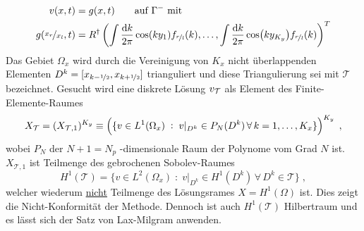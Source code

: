 \begin{equation}
  \begin{aligned}
    v(x,t) &= g(x,t) \qquad \text{auf }{\Gamma^-} \text{ mit} \\
    g(\nicefrac{x_r}{x_l},t) &= R^{\dagger} \left(\int \frac{\mathop{}\!\mathrm{d} k}{2\pi} \cos(ky_1)     f_{\nicefrac{r}{l}} (k), \dots,
                                            \int \frac{\mathop{}\!\mathrm{d} k}{2\pi} \cos(ky_{K_y}) f_{\nicefrac{r}{l}} (k)\right)^T
  \end{aligned}
\end{equation}
Das Gebiet $\Omega_x$ wird durch die Vereinigung von $K_x$ nicht überlappenden Elementen ${D^k = [x_{k-\nicefrac{1}{2}} , x_{k+\nicefrac{1}{2}}]}$ trianguliert und diese Triangulierung sei mit $\mathcal{T}$ bezeichnet. Gesucht wird eine diskrete Lösung $v_{\mathcal{T}}$ als Element des Finite-Elemente-Raumes
\begin{equation}
  X_{\mathcal{T}} = (X_{\mathcal{T},1})^{K_y} \equiv \left( \{ v \in L^1(\Omega_x) \; : \; v\rvert_{D^k} \in P_N(D^k) \, \forall \, k=1,\dots,K_x \} \right)^{K_y} \; ,
  \label{eq:FES}
\end{equation}
wobei $P_N$ der ${N+1=N_p}$ -dimensionale Raum der Polynome vom Grad $N$ ist. $X_{\mathcal{T},1}$ ist Teilmenge des gebrochenen Sobolev-Raumes
\begin{equation}
    H^1(\mathcal{T}) = \{ v \in L^2(\Omega_x) \; : \; v|_{D^k} \in H^1(D^k) \, \forall \, D^k \in \mathcal{T} \} \; ,
\end{equation}
welcher wiederum \underline{nicht} Teilmenge des Lösungsrames $X=H^1(\Omega)$ ist. Dies zeigt die Nicht-Konformität der Methode. Dennoch ist auch $H^1(\mathcal{T})$ Hilbertraum und es lässt sich der Satz von Lax-Milgram anwenden.

